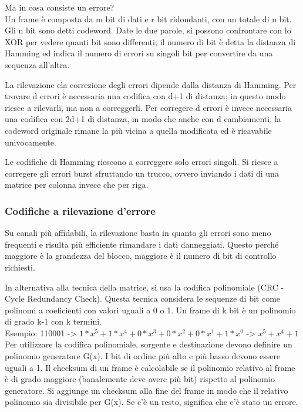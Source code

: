 Ma in cosa consiste un errore? \\
Un frame è composta da m bit di dati e r bit ridondanti, con un totale di n bit.
Gli n bit sono detti codeword. 
Date le due parole, si possono confrontare con lo XOR per vedere quanti bit sono differenti;
il numero di bit è detta la distanza di Hamming ed indica il numero di errori su singoli bit per convertire da una sequenza all'altra.

La rilevazione ela correzione degli errori dipende dalla distanza di Hamming.
Per trovare d errori è necessaria una codifica con d+1 di distanza;
in questo modo riesce a rilevarli, ma non a correggerli.
Per corregere d errori è invece necessaria una codifica con 2d+1 di distanza,
in modo che anche con d cambiamenti, la codeword originale rimane la più vicina a quella modificata ed è ricavabile univocamente.

Le codifiche di Hamming riescono a correggere solo errori singoli.
Si riesce a corregere gli errori burst sfruttando un trucco, ovvero inviando i dati di una matrice per colonna invece che per riga.

\subsubsection{Codifiche a rilevazione d'errore}
Su canali più affidabili, la rilevazione basta in quanto gli errori sono meno frequenti e risulta più efficiente rimandare i dati danneggiati.
Questo perché maggiore è la grandezza del blocco, maggiore è il numero di bit di controllo richiesti.

In alternativa alla tecnica della matrice, si usa la codifica polinomiale (CRC - Cycle Redundancy Check).
Questa tecnica considera le sequenze di bit come polinomi a coeficienti con valori uguali a 0 o 1.
Un frame di k bit è un polinomio di grado k-1 con k termini.\\
Esempio: 110001 -> $1*x^5+1*x^4+0*x^3+0*x^2+0*x^1+1*x^0$ -> $x^5+x^4+1$\\

Per utilizzare la codifica polinomiale, sorgente e destinazione devono definire un polinomio generatore G(x).
I bit di ordine più alto e più basso devono essere uguali a 1.
Il checksum di un frame è calcolabile se il polinomio relativo al frame è di grado maggiore (banalemente deve avere più bit) rispetto al polinomio generatore.
Si aggiunge un checksum alla fine del frame in modo che il relativo polinomio sia divisibile per G(x).
Se c'è un resto, significa che c'è stato un errore.

